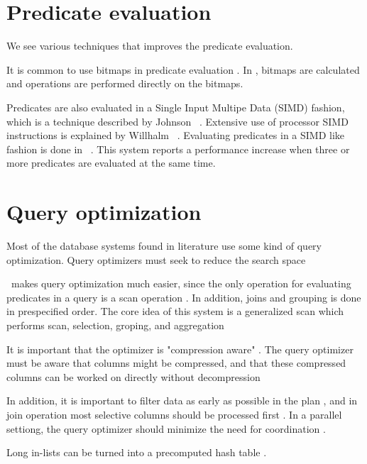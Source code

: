 \section{Predicate evaluation}
\label{sec:Predicate evaluation}
We see various techniques that improves the predicate evaluation.

It is common to use bitmaps in predicate evaluation \cite{Raman2008-gi, Raman2013-em}. In \blink, bitmaps are calculated and operations are performed directly on the bitmaps.

Predicates are also evaluated in a Single Input Multipe Data (SIMD) fashion, which is a technique described by Johnson \ea~\cite{Johnson2008-cp}. Extensive use of processor SIMD instructions is explained by Willhalm \ea~\cite{Willhalm2009-hu, Willhalm2013-ri}. Evaluating predicates in a SIMD like fashion is done in \blink~\cite{Raman2008-gi}.  This system reports a performance increase when three or more predicates are evaluated at the same time.

\section{Query optimization}
\label{sec:Query optimization}
Most of the database systems found in literature use some kind of query optimization. Query optimizers must seek to reduce the search space \cite{Boncz2002-yj, Stonebraker2005-qz}

\blink~makes query optimization much easier, since the only operation for evaluating predicates in a query is a scan operation \cite{Barber2012-xt}. In addition, joins and grouping is done in prespecified order. The core idea of this system is a generalized scan which performs scan, selection, groping, and aggregation \cite{Raman2008-gi}

It is important that the optimizer is "compression aware" \cite{Westmann200-mz}. The query optimizer must be aware that columns might be compressed, and that these compressed columns can be worked on directly without decompression \cite{Stonebraker2005-qz}

In addition, it is important to filter data as early as possible in the plan \cite{Lamb2012-kg}, and in join operation  most selective columns should be processed first \cite{Holloway2008-rr}. In a parallel settiong, the query optimizer should minimize the need for coordination \cite{Exasol2014-xh}.

Long in-lists can be turned into a precomputed hash table \cite{Raman2013-em}.

